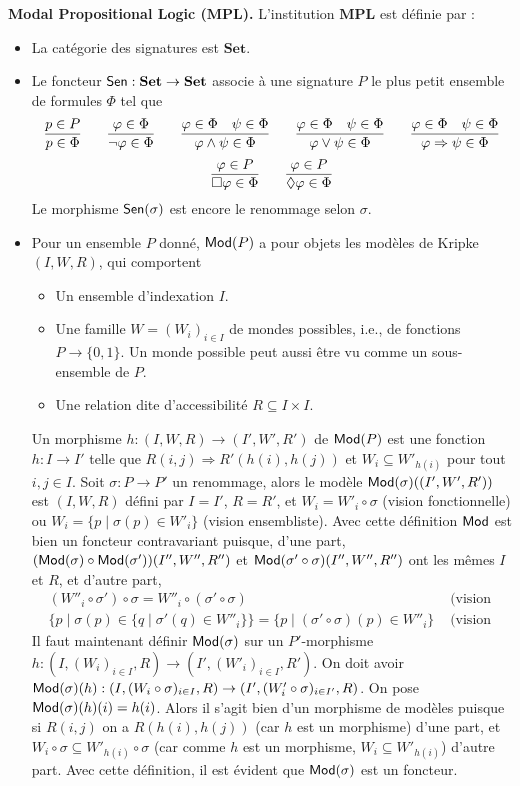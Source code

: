 \documentclass[11pt,a4paper]{article}
\newcommand{\ph}{\varphi}
\newcommand{\itemz}{\item[$\triangleright$]}
\newcommand{\gr}{\textbf}
\newcommand{\info}[1]{\text{{\fontfamily{lmss}\selectfont #1}}}
\newcommand{\Mod}{\info{Mod}}
\newcommand{\Sen}{\info{Sen}}
\newcommand{\1}{\mathbbm{1}}
\begin{document}
\gr{Modal Propositional Logic ($\gr{MPL}$).} L'institution $\gr{MPL}$ est définie par :
\begin{itemize}
\itemz La catégorie des signatures est $\gr{Set}$.
\itemz Le foncteur $\Sen : \gr{Set} \to \gr{Set}$ associe à une signature $P$ le plus petit ensemble de formules $\Phi$ tel que
$$
\infer{p \in \Phi}{p \in P}
\qquad
\infer{\neg \ph \in \Phi}{\ph \in \Phi}
\qquad
\infer{\ph \wedge \psi \in \Phi}{\ph \in \Phi & \psi \in \Phi }
\qquad
\infer{\ph \vee \psi \in \Phi}{\ph \in \Phi & \psi \in \Phi }
\qquad
\infer{\ph \Rightarrow \psi \in \Phi}{\ph \in \Phi & \psi \in \Phi }
$$
$$
\infer{\square \ph \in \Phi}{\ph \in P}
\qquad
\infer{\lozenge \ph \in \Phi}{\ph \in P}
$$
Le morphisme $\Sen(\sigma)$ est encore le renommage selon $\sigma$.
\itemz Pour un ensemble $P$ donné, $\Mod(P)$ a pour objets les modèles de Kripke $(I,W,R)$, qui comportent
\begin{itemize}
\setlength\itemsep{-0.3em}
\item Un ensemble d'indexation $I$.
\item Une famille $W = (W_i)_{i\in I}$ de mondes possibles, i.e., de fonctions $P \to \{ 0,1 \}$. Un monde possible peut aussi être vu comme un sous-ensemble de $P$.
\item Une relation dite d'accessibilité $R \subseteq I \times I$.
\end{itemize}
Un morphisme $h : (I,W,R) \to (I',W',R')$ de $\Mod(P)$ est une fonction $h : I \to I'$ telle que $R(i,j) \Rightarrow R'(h(i),h(j))$ et $W_i \subseteq W'_{h(i)}$ pour tout $i,j \in I$. Soit $\sigma : P \to P'$ un renommage, alors le modèle $\Mod(\sigma)((I',W',R'))$ est $(I,W,R)$ défini par $I = I'$, $R = R'$, et $W_i = W'_i \circ \sigma$ (vision fonctionnelle) ou $W_i = \{ p \mid \sigma(p) \in W'_i \}$ (vision ensembliste). Avec cette définition $\Mod$ est bien un foncteur contravariant puisque, d'une part, $(\Mod(\sigma) \circ \Mod(\sigma')) (I'',W'',R'')$ et $\Mod(\sigma' \circ \sigma)(I'',W'',R'')$ ont les mêmes $I$ et $R$, et d'autre part,
\begin{align*}
&(W''_i \circ \sigma') \circ \sigma = W''_i \circ (\sigma' \circ \sigma) &\text{ (vision fonctionnelle)}\\
&  \{ p \mid \sigma(p) \in \{ q \mid \sigma'(q) \in W''_i \}\} = \{ p \mid (\sigma' \circ \sigma)(p) \in W''_i \} & \text{ (vision ensembliste)}
\end{align*}
Il faut maintenant définir $\Mod(\sigma)$ sur un $P'$-morphisme $h : (I,(W_i)_{i\in I},R) \to (I',(W'_i)_{i\in I},R')$. On doit avoir $\Mod(\sigma)(h) : (I,(W_i \circ \sigma)_{i\in I},R) \to (I',(W'_i \circ \sigma)_{i\in I'},R)$. On pose $\Mod(\sigma)(h)(i) = h(i)$. Alors il s'agit bien d'un morphisme de modèles puisque si $R(i,j)$ on a $R(h(i),h(j))$ (car $h$ est un morphisme) d'une part, et $W_i \circ \sigma \subseteq W'_{h(i)} \circ \sigma$ (car comme $h$ est un morphisme, $W_i \subseteq W'_{h(i)}$) d'autre part. Avec cette définition, il est évident que $\Mod(\sigma)$ est un foncteur.

\end{itemize}
\end{document}

